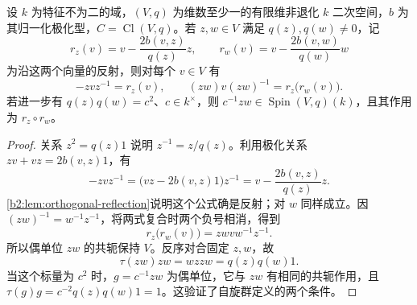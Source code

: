\begin{proposition}\label{b2:prop:B-spin-reflection-pair}
	设 \(k\) 为特征不为二的域，\((V,q)\) 为维数至少一的有限维非退化 \(k\) 二次空间，\(b\) 为其归一化极化型，\(C=\operatorname{Cl}(V,q)\)。若 \(z,w\in V\) 满足 \(q(z),q(w)\ne0\)，记
	\[
		r_z(v)=v-\frac{2b(v,z)}{q(z)}z, \qquad r_w(v)=v-\frac{2b(v,w)}{q(w)}w
	\]
	为沿这两个向量的反射，则对每个 \(v\in V\) 有
	\[
		-zvz^{-1}=r_z(v),\qquad (zw)v(zw)^{-1}=r_z\bigl(r_w(v)\bigr).
	\]
	若进一步有 \(q(z)q(w)=c^2\)、\(c\in k^\times\)，则 \(c^{-1}zw\in\operatorname{Spin}(V,q)(k)\)，且其作用为 \(r_z\circ r_w\)。
\end{proposition}
\begin{proof}
	关系 \(z^2=q(z)1\) 说明 \(z^{-1}=z/q(z)\)。利用极化关系 \(zv+vz=2b(v,z)1\)，有
	\[
		-zvz^{-1} =\bigl(vz-2b(v,z)1\bigr)z^{-1} =v-\frac{2b(v,z)}{q(z)}z.
	\]
	\cref{b2:lem:orthogonal-reflection}说明这个公式确是反射；对 \(w\) 同样成立。因 \((zw)^{-1}=w^{-1}z^{-1}\)，将两式复合时两个负号相消，得到
	\[
		r_z\bigl(r_w(v)\bigr)=z w v w^{-1}z^{-1}.
	\]
	所以偶单位 \(zw\) 的共轭保持 \(V\)。反序对合固定 \(z,w\)，故
	\[
		\tau(zw)zw=wzzw=q(z)q(w)1.
	\]
	当这个标量为 \(c^2\) 时，\(g=c^{-1}zw\) 为偶单位，它与 \(zw\) 有相同的共轭作用，且 \(\tau(g)g=c^{-2}q(z)q(w)1=1\)。这验证了自旋群定义的两个条件。
\end{proof}

